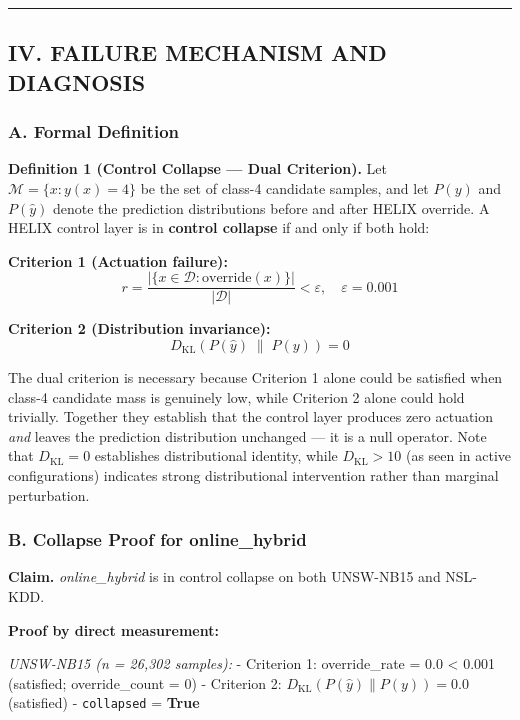 \documentclass[
  conference]{IEEEtran}
\begin{document}
\begin{center}\rule{0.5\linewidth}{0.5pt}\end{center}

\subsection{IV. FAILURE MECHANISM AND
DIAGNOSIS}\label{iv.-failure-mechanism-and-diagnosis}

\subsubsection{A. Formal Definition}\label{a.-formal-definition}

\textbf{Definition 1 (Control Collapse --- Dual Criterion).} Let
\(\mathcal{M} = \{x : y(x) = 4\}\) be the set of class-4 candidate
samples, and let \(P(y)\) and \(P(\hat{y})\) denote the prediction
distributions before and after HELIX override. A HELIX control layer is
in \textbf{control collapse} if and only if both hold:

\textbf{Criterion 1 (Actuation failure):}
\[r = \frac{|\{x \in \mathcal{D} : \text{override}(x)\}|}{|\mathcal{D}|} < \varepsilon, \quad \varepsilon = 0.001\]

\textbf{Criterion 2 (Distribution invariance):}
\[D_{\text{KL}}\!\left(P(\hat{y}) \;\|\; P(y)\right) = 0\]

The dual criterion is necessary because Criterion 1 alone could be
satisfied when class-4 candidate mass is genuinely low, while Criterion
2 alone could hold trivially. Together they establish that the control
layer produces zero actuation \emph{and} leaves the prediction
distribution unchanged --- it is a null operator. Note that
\(D_{\text{KL}} = 0\) establishes distributional identity, while
\(D_{\text{KL}} > 10\) (as seen in active configurations) indicates
strong distributional intervention rather than marginal perturbation.

\subsubsection{B. Collapse Proof for
online\_hybrid}\label{b.-collapse-proof-for-online_hybrid}

\textbf{Claim.} \emph{online\_hybrid} is in control collapse on both
UNSW-NB15 and NSL-KDD.

\textbf{Proof by direct measurement:}

\emph{UNSW-NB15 (n = 26,302 samples):} - Criterion 1: override\_rate =
0.0 \textless{} 0.001 (satisfied; override\_count = 0) - Criterion 2:
\(D_{\text{KL}}(P(\hat{y}) \| P(y)) = 0.0\) (satisfied) -
\texttt{collapsed} = \textbf{True}
\end{document}
